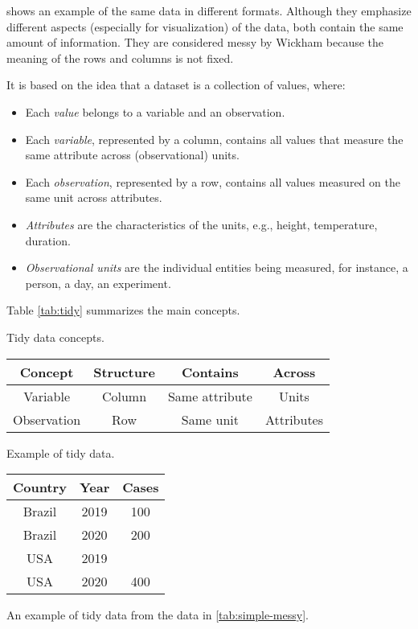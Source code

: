  shows an example of the same data in different formats.  Although
they emphasize different aspects (especially for visualization) of the data, both contain
the same amount of information.  They are considered messy by Wickham because the meaning
of the rows and columns is not fixed.

It is based on the idea that a dataset is a collection of values, where:
\begin{itemize}
  \itemsep0em
  \item Each \emph{value} belongs to a variable and an observation.
  \item Each \emph{variable}, represented by a column, contains all values that measure
    the same attribute across (observational) units.
  \item Each \emph{observation}, represented by a row, contains all values measured on the
    same unit across attributes.
  \item \emph{Attributes} are the characteristics of the units, e.g., height, temperature,
    duration.
  \item \emph{Observational units} are the individual entities being measured, for
    instance, a person, a day, an experiment.
\end{itemize}
Table \ref{tab:tidy} summarizes the main concepts.

\begin{tablebox}[label=tab:tidy]{Tidy data concepts.}
  \centering
  \begin{tabular}{cccc}
    \toprule
    \textbf{Concept} & \textbf{Structure} & \textbf{Contains} & \textbf{Across} \\
    \midrule
    Variable & Column & Same attribute & Units \\
    Observation & Row & Same unit & Attributes \\
    \bottomrule
  \end{tabular}
\end{tablebox}

\begin{tablebox}[label=tab:simple-tidy]{Example of tidy data.}
  \centering
  \begin{tabular}{ccc}
    \toprule
    \textbf{Country} & \textbf{Year} & \textbf{Cases} \\
    \midrule
    Brazil & 2019 & 100 \\
    Brazil & 2020 & 200 \\
    USA & 2019 & \\
    USA & 2020 & 400 \\
    \bottomrule
  \end{tabular}
  \tcblower
  An example of tidy data from the data in \cref{tab:simple-messy}.
\end{tablebox}

